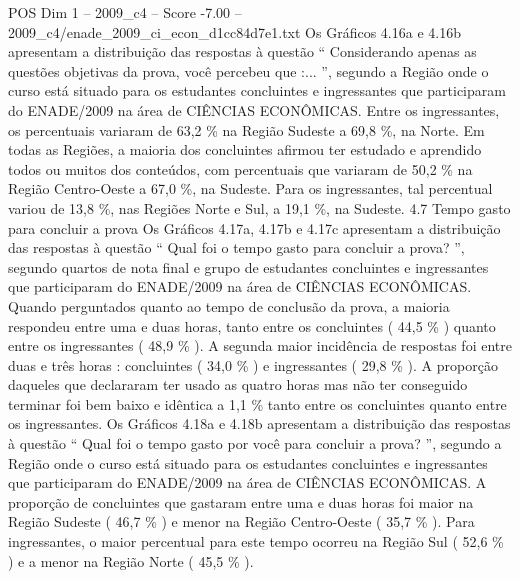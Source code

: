 \begin{textsample}{POS Dim 1 – 2009\_c4 – Score -7.00 – 2009\_c4/enade\_2009\_ci\_econ\_d1cc84d7e1.txt}
Os Gráficos 4.16a e 4.16b apresentam a distribuição das respostas à questão “ Considerando apenas as questões objetivas da prova, você percebeu que :... ”, segundo a Região onde o curso está situado para os estudantes concluintes e ingressantes que participaram do ENADE/2009 na área de CIÊNCIAS ECONÔMICAS.
Entre os ingressantes, os percentuais variaram de 63,2 \% na Região Sudeste a 69,8 \%, na Norte.
Em todas as Regiões, a maioria dos concluintes afirmou ter estudado e aprendido todos ou muitos dos conteúdos, com percentuais que variaram de 50,2 \% na Região Centro-Oeste a 67,0 \%, na Sudeste.
Para os ingressantes, tal percentual variou de 13,8 \%, nas Regiões Norte e Sul, a 19,1 \%, na Sudeste. 4.7 Tempo gasto para concluir a prova Os Gráficos 4.17a, 4.17b e 4.17c apresentam a distribuição das respostas à questão “ Qual foi o tempo gasto para concluir a prova? ”, segundo quartos de nota final e grupo de estudantes concluintes e ingressantes que participaram do ENADE/2009 na área de CIÊNCIAS ECONÔMICAS.
Quando perguntados quanto ao tempo de conclusão da prova, a maioria respondeu entre uma e duas horas, tanto entre os concluintes ( 44,5 \% ) quanto entre os ingressantes ( 48,9 \% ).
A segunda maior incidência de respostas foi entre duas e três horas : concluintes ( 34,0 \% ) e ingressantes ( 29,8 \% ).
A proporção daqueles que declararam ter usado as quatro horas mas não ter conseguido terminar foi bem baixo e idêntica a 1,1 \% tanto entre os concluintes quanto entre os ingressantes.
Os Gráficos 4.18a e 4.18b apresentam a distribuição das respostas à questão “ Qual foi o tempo gasto por você para concluir a prova? ”, segundo a Região onde o curso está situado para os estudantes concluintes e ingressantes que participaram do ENADE/2009 na área de CIÊNCIAS ECONÔMICAS.
A proporção de concluintes que gastaram entre uma e duas horas foi maior na Região Sudeste ( 46,7 \% ) e menor na Região Centro-Oeste ( 35,7 \% ).
Para ingressantes, o maior percentual para este tempo ocorreu na Região Sul ( 52,6 \% ) e a menor na Região Norte ( 45,5 \% ).

\end{textsample}
